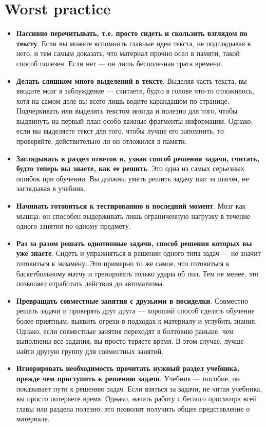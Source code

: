 \documentclass{article}
\begin{document}
\section{Worst practice}
\begin{itemize}
\item \textbf{Пассивно перечитывать, т.е. просто сидеть и скользить взглядом по тексту}. Если вы можете вспомнить главные идеи текста, не подглядывая в него, и тем самым доказать, что материал прочно осел в памяти, такой способ полезен. Если нет --- он лишь бесполезная трата времени.
\item \textbf{Делать слишком много выделений в тексте}. Выделяя часть текста, вы вводите мозг в заблуждение --- считаете, будто в голове что-то отложилось, хотя на самом деле вы всего лишь водите карандашом по странице. Подчеркивать или выделять текстом иногда и полезно для того, чтобы выдвинуть на первый план особо важные фрагменты информации. Однако, если вы выделяете текст для того, чтобы лучше его запомнить, то проверяйте, действительно ли он отложился в памяти.
\item \textbf{Заглядывать в раздел ответов и, узнав способ решения задачи, считать, будто теперь вы знаете, как ее решить}. Это одна из самых серьезных ошибок при обучении. Вы должны уметь решить задачу шаг за шагом, не заглядывая в учебник.
\item \textbf{Начинать готовиться к тестированию в последний момент}. Мозг как мышца: он способен выдерживать лишь ограниченную нагрузку в течение одного занятия по одному предмету.
\item \textbf{Раз за разом решать однотипные задачи, способ решения которых вы уже знаете}. Сидеть и упражняться в решении одного типа задач --- не значит готовиться к экзамену. Это примерно то же самое, что готовиться к баскетбольному матчу и тренировать только удары об пол. Тем не менее, это позволяет отработать действия до автоматизма.
\item \textbf{Превращать совместные занятия с друзьями в посиделки}. Совместно решать задачи и проверять друг друга --- хороший способ сделать обучение более приятным, выявить огрехи в подходах к материалу и углубить знания. Однако, если совместные занятия переходят в болтовню раньше, чем выполнены все задания, вы просто теряете время. В этом случае, лучше найти другую группу для совместных занятий.
\item \textbf{Игнорировать необходимость прочитать нужный раздел учебника, прежде чем приступить к решению задачи}. Учебник --- пособие, он показывает пути к решению задач. Если взяться за задачи, не читая учебника, вы просто потеряете время. Однако, начать работу с беглого просмотра всей главы или раздела полезно: это позволит получить общее представление о материале.

\end{itemize}
\end{document}
